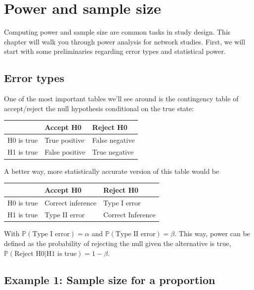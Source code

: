 \documentclass[]{book}
\begin{document}
\hypertarget{part2-power}{%
\chapter{Power and sample size}\label{part2-power}}

Computing power and sample size are common tasks in study design. This chapter will walk you
through power analysis for network studies. First, we will start with some preliminaries
regarding error types and statistical power.

\hypertarget{error-types}{%
\section{Error types}\label{error-types}}

One of the most important tables we'll see around is the contingency table of accept/reject the null hypothesis conditional on the true state:

\begin{tabular}{l|l|l}
\hline
  & Accept H0 & Reject H0\\
\hline
H0 is true & True positive & False negative\\
\hline
H1 is true & False positive & True negative\\
\hline
\end{tabular}

A better way, more statistically accurate version of this table would be

\begin{tabular}{l|l|l}
\hline
  & Accept H0 & Reject H0\\
\hline
H0 is true & Correct inference & Type I error\\
\hline
H1 is true & Type II error & Correct Inference\\
\hline
\end{tabular}

With \(\mathbb{P}{(\mbox{Type I error})} = \alpha\) and \(\mathbb{P}{(\mbox{Type II error})} = \beta\). This way, power can be defined as the
probability of rejecting the null given the alternative is true, \(\mathbb{P}{(\mbox{Reject H0}|\mbox{H1 is true})} = 1-\beta\).

\hypertarget{example-1-sample-size-for-a-proportion}{%
\section{Example 1: Sample size for a proportion}\label{example-1-sample-size-for-a-proportion}}
\end{document}
